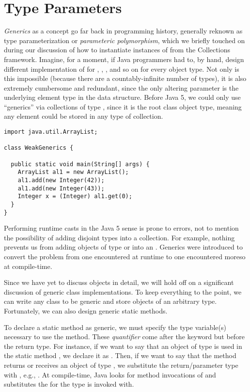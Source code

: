 \section{Type Parameters}

\emph{Generics} as a concept go far back in programming history, generally reknown as type parameterization or \emph{parameteric polymorphism}, which we briefly touched on during our discussion of how to instantiate instances of  from the Collections framework. 
Imagine, for a moment, if Java programmers had to, by hand, design different implementation of  for , , , and so on for every object type. 
Not only is this impossible (because there are a countably-infinite number of types), it is also extremely cumbersome and redundant, since the only altering parameter is the underlying element type in the data structure. 
Before Java 5, we could only use ``generics'' via collections of type , since it is the root class object type, meaning any element could be stored in any type of collection.

\begin{lstlisting}[language=MyJava]
import java.util.ArrayList;

class WeakGenerics {

  public static void main(String[] args) {
    ArrayList al1 = new ArrayList();
    al1.add(new Integer(42));
    al1.add(new Integer(43));
    Integer x = (Integer) al1.get(0);
  }
}
\end{lstlisting}

Performing runtime casts in the Java 5 sense is prone to errors, not to mention the possibility of adding disjoint types into a collection. 
For example, nothing prevents us from adding objects of type  or  into an . 
Generics were introduced to convert the problem from one encountered at runtime to one encountered moreso at compile-time. 

Since we have yet to discuss objects in detail, we will hold off on a significant discussion of generic class implementations. 
To keep everything to the point, we can write any class to be generic and store objects of an arbitrary type. 
Fortunately, we can also design generic static methods. 

To declare a static method as generic, we must specify the type variable(s) necessary to use the method. 
These \emph{quantifier} come after the  keyword but before the return type. 
For instance, if we want to say that an object of type  is used in the static method , we declare it as . 
Then, if we want to say that the method returns or receives an object of type , we substitute the return/parameter type with , e.g., . 
At compile-time, Java looks for method invocations of  and substitutes the  for the type  is invoked with. 

